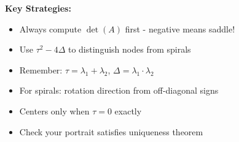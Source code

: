 \documentclass[12pt]{article}
\begin{document}
\begin{hint}
\textbf{Key Strategies:}
\begin{itemize}
    \item Always compute $\det(A)$ first - negative means saddle!
    \item Use $\tau^{2} - 4\Delta$ to distinguish nodes from spirals
    \item Remember: $\tau = \lambda_{1} + \lambda_{2}$, $\Delta = \lambda_{1} \cdot \lambda_{2}$
    \item For spirals: rotation direction from off-diagonal signs
    \item Centers only when $\tau = 0$ exactly
    \item Check your portrait satisfies uniqueness theorem
\end{itemize}
\end{hint}
\end{document}
